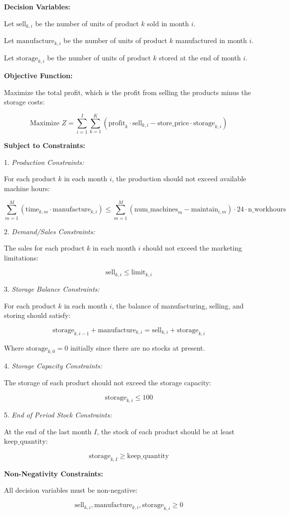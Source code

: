 \documentclass{article}
\begin{document}
\textbf{Decision Variables:}

Let \( \text{sell}_{k, i} \) be the number of units of product \( k \) sold in month \( i \).

Let \( \text{manufacture}_{k, i} \) be the number of units of product \( k \) manufactured in month \( i \).

Let \( \text{storage}_{k, i} \) be the number of units of product \( k \) stored at the end of month \( i \).

\textbf{Objective Function:}

Maximize the total profit, which is the profit from selling the products minus the storage costs:

\[
\text{Maximize } Z = \sum_{i=1}^{I} \sum_{k=1}^{K} \left( \text{profit}_k \cdot \text{sell}_{k, i} - \text{store\_price} \cdot \text{storage}_{k, i} \right)
\]

\textbf{Subject to Constraints:}

1. \textit{Production Constraints:}

For each product \( k \) in each month \( i \), the production should not exceed available machine hours:

\[
\sum_{m=1}^{M} \left( \text{time}_{k, m} \cdot \text{manufacture}_{k, i} \right) \leq \sum_{m=1}^{M} \left( \text{num\_machines}_m - \text{maintain}_{i, m} \right) \cdot 24 \cdot \text{n\_workhours}
\]

2. \textit{Demand/Sales Constraints:}

The sales for each product \( k \) in each month \( i \) should not exceed the marketing limitations:

\[
\text{sell}_{k, i} \leq \text{limit}_{k, i}
\]

3. \textit{Storage Balance Constraints:}

For each product \( k \) in each month \( i \), the balance of manufacturing, selling, and storing should satisfy:

\[
\text{storage}_{k, i-1} + \text{manufacture}_{k, i} = \text{sell}_{k, i} + \text{storage}_{k, i}
\]

Where \( \text{storage}_{k, 0} = 0 \) initially since there are no stocks at present.

4. \textit{Storage Capacity Constraints:}

The storage of each product should not exceed the storage capacity:

\[
\text{storage}_{k, i} \leq 100
\]

5. \textit{End of Period Stock Constraints:}

At the end of the last month \( I \), the stock of each product should be at least \( \text{keep\_quantity} \):

\[
\text{storage}_{k, I} \geq \text{keep\_quantity}
\]

\textbf{Non-Negativity Constraints:}

All decision variables must be non-negative:

\[
\text{sell}_{k, i}, \text{manufacture}_{k, i}, \text{storage}_{k, i} \geq 0
\]
\end{document}
